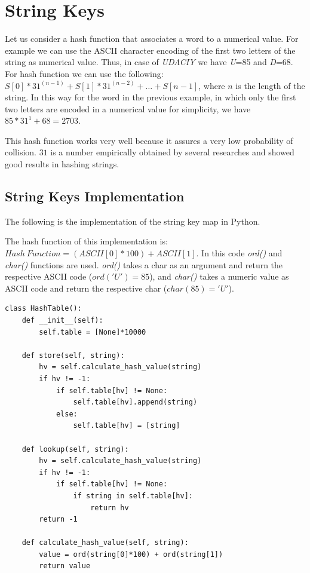 \section{String Keys}
Let us consider a hash function that associates a word to a numerical value. For example we can use the ASCII character encoding of the first two letters of the string as numerical value. Thus, in case of \textit{UDACIY} we have \textit{U}=85 and \textit{D}=68. For hash function we can use the following: \(S\left[0\right] * 31^{(n-1)} + S\left[1\right] * 31^{(n-2)} + \ldots + S\left[n-1\right]\), where \(n\) is the length of the string. In this way for the word in the previous example, in which only the first two letters are encoded in a numerical value for simplicity, we have \(85*31^{1} + 68 = 2703\).

This hash function works very well because it assures a very low probability of collision. \(31\) is a number empirically obtained by several researches and showed good results in hashing strings.

\subsection{String Keys Implementation}
The following is the implementation of the string key map in Python.

The hash function of this implementation is: \(Hash \ Function = (ASCII[0]*100) + ASCII[1]\). In this code \textit{ord()} and \textit{char()} functions are used. \textit{ord()} takes a char as an argument and return the respective ASCII code (\(ord('U')=85\)), and \textit{char()} takes a numeric value as ASCII code and return the respective char (\(char(85)='U'\)).
\begin{lstlisting}[firstnumber=1, caption={String key implementation.}]
class HashTable():
	def __init__(self):
		self.table = [None]*10000
	
	def store(self, string):
		hv = self.calculate_hash_value(string)
		if hv != -1:
			if self.table[hv] != None:
				self.table[hv].append(string)
			else:
				self.table[hv] = [string]
	
	def lookup(self, string):
		hv = self.calculate_hash_value(string)
		if hv != -1:
			if self.table[hv] != None:
				if string in self.table[hv]:
					return hv
		return -1
	
	def calculate_hash_value(self, string):
		value = ord(string[0]*100) + ord(string[1])
		return value
\end{lstlisting}